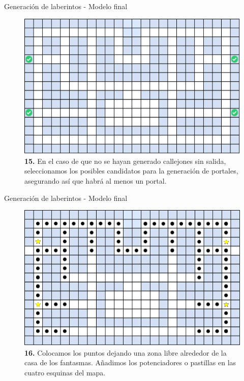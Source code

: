 \documentclass{beamer}
\begin{document}
    \begin{frame}{Generación de laberintos - Modelo final \scriptsize{\hfill \secname}}
        \begin{figure}[H]
        \centering
            \includegraphics[scale=0.475]{img/paso15.png}
            \caption{\textbf{15.} En el caso de que no se hayan generado callejones sin salida, seleccionamos los posibles candidatos para la generación de portales, asegurando así que habrá al menos un portal.}
        \end{figure}
    \end{frame}
    
    \begin{frame}{Generación de laberintos - Modelo final \scriptsize{\hfill \secname}}
        \begin{figure}[H]
        \centering
            \includegraphics[scale=0.475]{img/paso16.png}
            \caption{\textbf{16.} Colocamos los puntos dejando una zona libre alrededor de la casa de los fantasmas. Añadimos los potenciadores o pastillas en las cuatro esquinas del mapa.}
        \end{figure}
    \end{frame}
    
\end{document}
